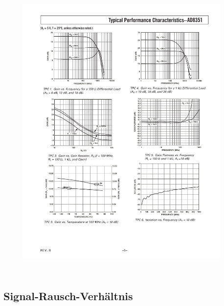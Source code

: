 \documentclass{beamer}
\begin{document}
\begin{frame}
\begin{columns}
		\begin{figure}[h!]
	\centering
	\includegraphics[width=1\textwidth, trim=115mm 180mm 15mm 30mm, clip=true]{images/Gain}
	\label{fig:graph_gain}
\end{figure}
	\begin{itemize}
	\end{itemize}
\end{columns}

\end{frame}

\subsection{Signal-Rausch-Verhältnis}
\end{document}
